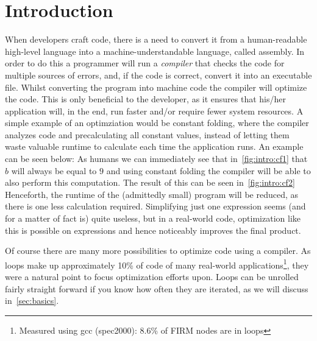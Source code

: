 \chapter{Introduction}\label{sec:intro}



When developers craft code, there is a need to convert it from a human-readable high-level language into a machine-understandable language, called assembly.
In order to do this a programmer will run a \textit{compiler} that checks the code for multiple sources of errors, and, if the code is correct, convert it into an executable file.
Whilst converting the program into machine code the compiler will optimize the code.
This is only beneficial to the developer, as it ensures that his/her application will, in the end, run faster and/or require fewer system resources.
A simple example of an optimziation would be constant folding, where the compiler analyzes code and precalculating all constant values, instead of letting them waste valuable runtime to calculate each time the application runs.
An example can be seen below:
As humans we can immediately see that in~\cref{fig:intro:cf1} that $b$ will always be equal to $9$ and using constant folding the compiler will be able to also perform this computation.
The result of this can be seen in~\cref{fig:intro:cf2}
Henceforth, the runtime of the (admittedly small) program will be reduced, as there is one less calculation required.
Simplifying just one expression seems (and for a matter of fact is) quite useless, but in a real-world code, optimization like this is possible on expressions and hence noticeably improves the final product.



Of course there are many more possibilities to optimize code using a compiler.
As loops make up approximately 10\% of code of many real-world applications\footnote{Measured using gcc (spec2000): 8.6\% of FIRM nodes are in loops}, they were a natural point to focus optimization efforts upon.
Loops can be unrolled fairly straight forward if you know how often they are iterated, as we will discuss in~\cref{sec:basics}.




